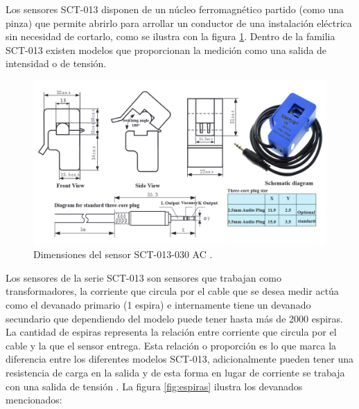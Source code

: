 Los sensores SCT-013 disponen de un núcleo ferromagnético partido (como una pinza) que permite abrirlo para arrollar un conductor de una instalación eléctrica sin necesidad de cortarlo, como se ilustra con la figura \ref{fig:sensorCorriente}. Dentro de la familia SCT-013 existen modelos que proporcionan la medición como una salida de intensidad o de tensión. 

\vspace{1.5cm}

\begin{figure}[htbp]
	\centering
	\includegraphics[width=1.0\textwidth]{./Figures/sensorCorriente2.png}
	\caption{Dimensiones del sensor SCT-013-030 AC \protect\footnotemark.}
	\label{fig:sensorCorriente}
\end{figure}



Los sensores de la serie SCT-013 son sensores que trabajan como transformadores, la corriente que circula por el cable que se desea medir actúa como el devanado primario (1 espira) e internamente tiene un devanado secundario que dependiendo del modelo puede tener hasta más de 2000 espiras. La cantidad de espiras representa la relación entre corriente que circula por el cable y la que el sensor entrega. Esta relación o proporción es lo que marca la diferencia entre los diferentes modelos SCT-013, adicionalmente pueden tener una resistencia de carga en la salida y de esta forma en lugar de corriente se trabaja con una salida de tensión \citep{WEBSITE:21}. La figura \ref{fig:espiras} ilustra los devanados mencionados:

